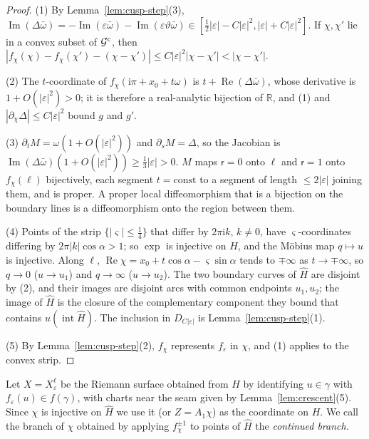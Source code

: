 \documentclass[11pt]{amsart}
\theoremstyle{definition}
\newcommand{\ii}{\mathrm{i}}
\begin{document}
\begin{proof}
(1) By Lemma~\ref{lem:cusp-step}(3),
$\operatorname{Im}(\Delta\bar\omega)=-\operatorname{Im}(\varepsilon\bar\omega)-\operatorname{Im}(\varepsilon\vartheta\bar\omega)
\in[\tfrac12|\varepsilon|-C|\varepsilon|^2,|\varepsilon|+C|\varepsilon|^2]$.  If $\chi,\chi'$ lie in a convex
subset of $\mathcal G^{\rm c}$, then
$|f_\chi(\chi)-f_\chi(\chi')-(\chi-\chi')|\le C|\varepsilon|^2|\chi-\chi'|<|\chi-\chi'|$.

(2) The $t$-coordinate of $f_\chi(\ii\pi+x_0+t\omega)$ is
$t+\operatorname{Re}(\Delta\bar\omega)$, whose derivative is $1+O(|\varepsilon|^2)>0$; it is
therefore a real-analytic bijection of $\mathbb R$, and (1) and
$|\partial_\chi\Delta|\le C|\varepsilon|^2$ bound $g$ and $g'$.

(3) $\partial_tM=\omega(1+O(|\varepsilon|^2))$ and $\partial_sM=\Delta$, so the Jacobian is
$\operatorname{Im}(\Delta\bar\omega)(1+O(|\varepsilon|^2))\ge\tfrac13|\varepsilon|>0$.  $M$ maps $\mathsf r=0$ onto $\ell$ and
$\mathsf r=1$ onto $f_\chi(\ell)$ bijectively, each segment $t=\mathrm{const}$ to a segment
of length $\le2|\varepsilon|$ joining them, and is proper.  A proper local
diffeomorphism that is a bijection on the boundary lines is a
diffeomorphism onto the region between them.

(4) Points of the strip $\{|\varsigma|\le\tfrac14\}$ that differ by
$2\pi\ii k$, $k\ne0$, have $\varsigma$-coordinates differing by
$2\pi|k|\cos\alpha>1$; so $\exp$ is injective on $\hat H$, and the Möbius map
$q\mapsto u$ is injective.  Along $\ell$,
$\operatorname{Re}\chi=x_0+t\cos\alpha-\varsigma\sin\alpha$ tends to $\mp\infty$ as $t\to\mp\infty$, so
$q\to0$ ($u\to u_1$) and $q\to\infty$ ($u\to u_2$).  The two boundary curves
of $\hat H$ are disjoint by (2), and their images are disjoint arcs with
common endpoints $u_1,u_2$; the image of $\hat H$ is the closure of the
complementary component they bound that contains $u(\operatorname{int}\hat H)$.
The inclusion in $D_{C|\varepsilon|}$ is Lemma~\ref{lem:cusp-step}(1).

(5) By Lemma~\ref{lem:cusp-step}(2), $f_\chi$ represents $f_\varepsilon$ in $\chi$, and (1)
applies to the convex strip.
\end{proof}

Let $X=X^\ell_\varepsilon$ be the Riemann surface obtained from $H$ by identifying
$u\in\gamma$ with $f_\varepsilon(u)\in f(\gamma)$, with charts near the seam given by
Lemma~\ref{lem:crescent}(5).  Since $\chi$ is injective on $\hat H$ we use it
(or $Z=A_1\chi$) as the coordinate on $H$.  We call the branch of $\chi$ obtained
by applying $f_\chi^{\pm1}$ to points of $\hat H$ the \emph{continued branch}.
\end{document}
